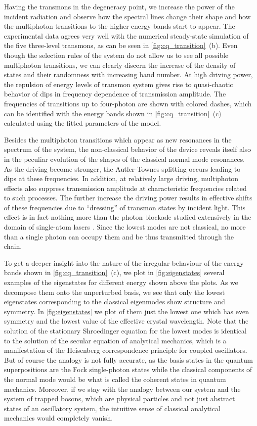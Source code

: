 \documentclass[%
 aps, pra,
 amsmath,amssymb,
 reprint,%
superscriptaddress
]{revtex4-2}
\begin{document}
Having the transmons in the degeneracy point, we increase the power of the incident radiation and observe how the spectral lines change their shape and how the multiphoton transitions to the higher energy bands start to appear. The experimental data agrees very well with the numerical steady-state simulation of the five three-level transmons, as can be seen in \autoref{fig:cq_transition}~(b). Even though the selection rules of the system do not allow us to see all possible multiphoton transitions, we can clearly discern the increase of the density of states and their randomness with increasing band number. At high driving power, the repulsion of energy levels of transmon system gives rise to quasi-chaotic behavior of dips in frequency dependence of transmission amplitude. The frequencies of transitions up to four-photon are shown with colored dashes, which can be identified with the energy bands shown in \autoref{fig:cq_transition}~(c) calculated using the fitted parameters of the model. 

Besides the multiphoton transitions which appear as new resonances in the spectrum of the system, the non-classical behavior of the device reveals itself also in the peculiar evolution of the shapes of the classical normal mode resonances. As the driving become stronger, the Autler-Townes splitting occurs leading to dips at these frequencies. In addition, at relatively large driving, multiphoton effects also suppress transmission amplitude at characteristic frequencies related to such processes. The further increase the driving power results in effective shifts of these frequencies due to ``dressing'' of transmon states by incident light. This effect is in fact nothing more than the photon blockade studied extensively in the domain of single-atom lasers \cite{birnbaum2005photon}. Since the lowest modes are not classical, no more than a single photon can occupy them and be thus transmitted through the chain.

To get a deeper insight into the nature of the irregular behaviour of the energy bands shown in \autoref{fig:cq_transition}~(c), we plot in \autoref{fig:eigenstates} several examples of the eigenstates for different energy shown above the plots. As we decompose them onto the unperturbed basis, we see that only the lowest eigenstates corresponding to the classical eigenmodes show structure and symmetry. In \autoref{fig:eigenstates} we plot of them just the lowest one which has even symmetry and the lowest value of the effective crystal wavelength. Note that the solution of the stationary Shroedinger equation for the lowest modes is identical to the solution of the secular equation of analytical mechanics, which is a manifestation of the Heisenberg correspondence principle for coupled oscillators. But of course the analogy is not fully accurate, as the basis states in the quantum superpositions are the Fock single-photon states while the classical components of the normal mode would be what is called the coherent states in quantum mechanics. Moreover, if we stay with the analogy between our system and the system of trapped bosons, which are physical particles and not just abstract states of an oscillatory system, the intuitive sense of classical analytical mechanics would completely vanish.
\end{document}
